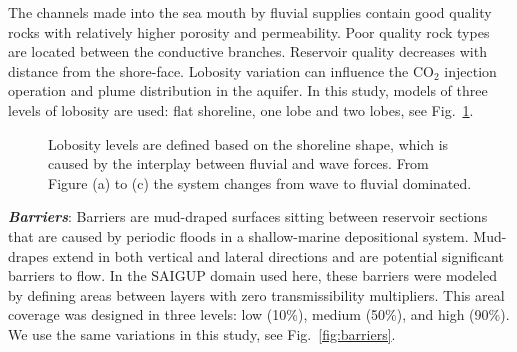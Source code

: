 The channels made into the sea mouth by fluvial supplies contain good quality
rocks with relatively higher porosity and permeability. Poor quality rock
types are located between the conductive branches. Reservoir quality decreases
with distance from the shore-face. Lobosity variation can influence the CO$_2$
injection operation and plume distribution in the aquifer. In this study, models
of three levels of lobosity are used: flat shoreline, one lobe and two lobes,
see Fig.~\ref{fig:lobCauses}.

 
\begin{figure}[tbp]%
  
   \hspace{0.5cm}
  \hspace{0.5cm}

  \caption{Lobosity levels are defined based on the shoreline shape, which is
caused by the interplay between fluvial and wave forces. From Figure (a) to (c) the system changes from wave to fluvial dominated.}
 \label{fig:lobCauses}
\end{figure}

\textbf{\textit{Barriers}}: 
Barriers are mud-draped surfaces sitting between reservoir sections that are
caused by periodic floods in a shallow-marine depositional system. Mud-drapes
extend in both vertical and lateral directions and are potential significant
barriers to
flow.  In the SAIGUP domain used here, these barriers were modeled by defining
areas between layers with zero transmissibility multipliers. This areal coverage was designed in three levels: low (10\%), medium
(50\%), and high (90\%). We use the same variations in this study, see
Fig.~\ref{fig:barriers}.


